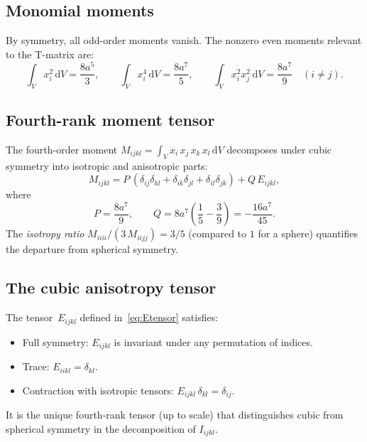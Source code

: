 \documentclass[11pt,a4paper]{article}
\newcommand{\dd}{\mathrm{d}}
\begin{document}
\subsection{Monomial moments}

By symmetry, all odd-order moments vanish. The nonzero even moments
relevant to the T-matrix are:
\begin{equation}
  \int_V x_i^2 \,\dd V = \frac{8a^5}{3},
  \qquad
  \int_V x_i^4 \,\dd V = \frac{8a^7}{5},
  \qquad
  \int_V x_i^2 x_j^2 \,\dd V = \frac{8a^7}{9}
  \quad (i \neq j).
  \label{eq:moments}
\end{equation}

\subsection{Fourth-rank moment tensor}

The fourth-order moment
$M_{ijkl} = \int_V x_i\,x_j\,x_k\,x_l\,\dd V$
decomposes under cubic symmetry into isotropic and anisotropic
parts:
\begin{equation}
  M_{ijkl} = P\,(\delta_{ij}\delta_{kl}
    + \delta_{ik}\delta_{jl} + \delta_{il}\delta_{jk})
  + Q\,E_{ijkl},
  \label{eq:moment4}
\end{equation}
where
\begin{equation}
  P = \frac{8a^7}{9},
  \qquad
  Q = 8a^7\!\left(\frac{1}{5} - \frac{3}{9}\right)
    = -\frac{16a^7}{45}.
  \label{eq:PQ}
\end{equation}
The \emph{isotropy ratio}
$M_{iiii}/(3\,M_{iijj}) = 3/5$ (compared to $1$ for a sphere)
quantifies the departure from spherical symmetry.

\subsection{The cubic anisotropy tensor}

The tensor~$E_{ijkl}$ defined in~\eqref{eq:Etensor} satisfies:
\begin{itemize}
  \item Full symmetry: $E_{ijkl}$ is invariant under any
    permutation of indices.
  \item Trace: $E_{iikl} = \delta_{kl}$.
  \item Contraction with isotropic tensors:
    $E_{ijkl}\,\delta_{kl} = \delta_{ij}$.
\end{itemize}
It is the unique fourth-rank tensor (up to scale) that distinguishes
cubic from spherical symmetry in the decomposition of
$I_{ijkl}$.
\end{document}
